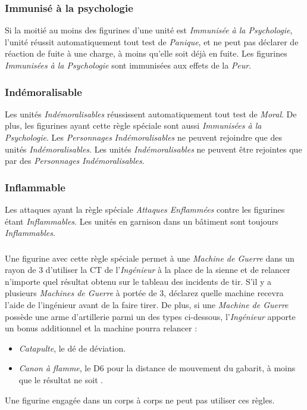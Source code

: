 \subsubsection*{Immunisé à la psychologie}

Si la moitié au moins des figurines d'une unité est \emph{Immunisée à la Psychologie}, l'unité réussit automatiquement tout test de \emph{Panique}, et ne peut pas déclarer de réaction de fuite à une charge, à moins qu'elle soit déjà en fuite. Les figurines \emph{Immunisées à la Psychologie} sont immunisées aux effets de la \emph{Peur}.

\subsubsection*{Indémoralisable}

Les unités \emph{Indémoralisables} réussissent automatiquement tout test de \emph{Moral}. De plus, les figurines ayant cette règle spéciale sont aussi \emph{Immunisées à la Psychologie}. Les \emph{Personnages} \emph{Indémoralisables} ne peuvent rejoindre que des unités \emph{Indémoralisables}. Les unités \emph{Indémoralisables} ne peuvent être rejointes que par des \emph{Personnages} \emph{Indémoralisables}.

\subsubsection*{Inflammable}

Les attaques ayant la règle spéciale \emph{Attaques Enflammées}  contre les figurines étant \emph{Inflammables}. Les unités en garnison dans un bâtiment sont toujours \emph{Inflammables}.

\subsubsection*{}

Une figurine avec cette règle spéciale permet à une \emph{Machine de Guerre} dans un rayon de \unit{3}{\pouce} d'utiliser la CT de l'\emph{Ingénieur} à la place de la sienne et de relancer n'importe quel résultat obtenu sur le tableau des incidents de tir. S'il y a plusieurs \emph{Machines de Guerre} à portée de \unit{3}{\pouce}, déclarez quelle machine recevra l'aide de l'ingénieur avant de la faire tirer. De plus, si une \emph{Machine de Guerre} possède une arme d'artillerie parmi un des types ci-dessous, l'\emph{Ingénieur} apporte un bonus additionnel et la machine pourra relancer :
\begin{itemize} [label={-}]
\item \emph{Catapulte}, le dé de déviation.
\item \emph{Canon à flamme}, le D6 pour la distance de mouvement du gabarit, à moins que le résultat ne soit .
\end{itemize}
Une figurine engagée dans un corps à corps ne peut pas utiliser ces règles.

